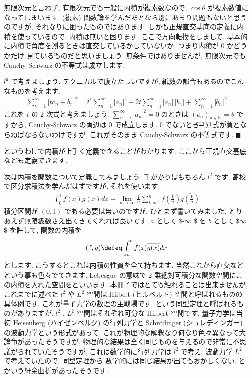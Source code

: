 \documentclass[openany, a4paper, oneside]{jsbook}
\begin{document}
無限次元と言わず, 有限次元でも一般に内積が複素数なので,  $\cos \theta$ が複素数値になってしまいます.
(複素) 関数論を学んだあとなら別にあまり問題もないと思うのですが, それなりに困ったものではあります.
しかも正規直交基底の定義に内積を使っているので, 内積は無いと困ります.
ここで方向転換をしまして, 基本的に内積で角度を測るときは直交しているかしていないか, つまり内積が $0$ かどうかだけ
見ているものだと思いましょう.
無条件ではありませんが, 無限次元でも Cauchy-Schwarz の不等式は成立します.

$l^2$ で考えましょう. テクニカルで腹立たしいですが, 紙数の都合もあるのでこんなものを考えます.
\begin{align}
    \sum_{n=1}^{\infty} |ta_n + b_n|^2
    =
    t^2\sum_{n=1}^{\infty} |a_n|^2 + 2t \sum_{n=1}^{\infty} |a_n|\,|b_n| +\sum_{n=1}^{\infty} |b_n|^2
\end{align}
これを $t$ の 2 次式と考えましょう.  $\sum_{n=1}^{\infty} |a_n|^2=0$ のときは $(a_n)_{n \in \mathbb{N}}=\theta$ ですから,
Cauchy-Schwarz の両辺は $0$ で成立します.  $0$ でないとき判別式が負とならねばならないわけですが, これがそのまま
Cauchy-Schwarz の不等式です.  $\blacksquare$

というわけで内積が上手く定義できることがわかります.
ここから正規直交基底なども定義できます.

次は内積を関数について定義してみましょう. 手がかりはもちろん $l^2$ です.
高校で区分求積法を学んだはずですが, それを使います.
\begin{align}
\int _{0}^1 f (x)\overline{g (x)}dx
=
\lim_{n \to \infty }\frac{1}{n}\sum_{k=1}^{n}f\left ( \frac{k}{n}\right) \overline{g\left ( \frac{k}{n}\right)}
\end{align}
積分区間が $(0,1)$ である必要は無いのですが, ひとまず書いてみました.
とりあえず無限級数さえ出てきてくれれば良いです.  $a$ として \$-$\infty$ \$ を $b$ として \$$\infty$ \$ を許して,
関数の内積を
\begin{align}
(f,g) \defeq \int_a^b f (x)\overline{g (x)}dx
\end{align}
とします. こうするとこれは内積の性質を全て持ちます.
当然これから直交などという事も色々でてきます.
Lebesgue の意味で 2 乗絶対可積分な関数空間にこの内積を入れた空間をといいます.
本冊子ではとても触れることは出来ませんが, これまでに述べた $l^2$ や $L^2$ 空間は
Hilbert (ヒルベルト) 空間と呼ばれるものの具体例です.
これが量子力学の数理の主戦場です.
という同型定理と呼ばれるものがありますが,
 $l^2$ ,  $L^2$ 空間はそれぞれ可分な Hilbert 空間です.
量子力学は当初 Heisenberg (ハイゼンベルク) の行列力学と Schr\"odinger (シュレディンガー) の波動力学という形式があって,
これが物理的な解釈なり何なり色々異なって大論争があったそうですが,
物理的な結果は全く同じものを与えるので非常に不思議がられていたそうですが,
これは数学的に行列力学は $l^2$ で考え, 波動力学 $L^2$ で考えていたので, 同型定理から
数学的には同じ結果が出てもおかしくない, とかいう紆余曲折があったそうです.
\end{document}
